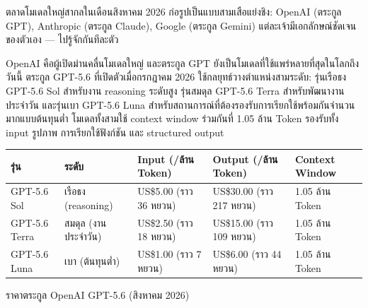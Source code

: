 


ตลาดโมเดลใหญ่สากลในเดือนสิงหาคม 2026 ก่อรูปเป็นแบบสามเสือแย่งชิง: OpenAI (ตระกูล GPT), Anthropic (ตระกูล Claude), Google (ตระกูล Gemini) แต่ละเจ้ามีเอกลักษณ์ชัดเจนของตัวเอง — ไปรู้จักกันทีละตัว


OpenAI คือผู้เปิดม่านคลื่นโมเดลใหญ่ และตระกูล GPT ยังเป็นโมเดลที่ใช้แพร่หลายที่สุดในโลกถึงวันนี้ ตระกูล GPT-5.6 ที่เปิดตัวเมื่อกรกฎาคม 2026 ใช้กลยุทธ์วางตำแหน่งสามระดับ: รุ่นเรือธง GPT-5.6 Sol สำหรับงาน reasoning ระดับสูง รุ่นสมดุล GPT-5.6 Terra สำหรับพัฒนางานประจำวัน และรุ่นเบา GPT-5.6 Luna สำหรับสถานการณ์ที่ต้องรองรับการเรียกใช้พร้อมกันจำนวนมากแบบต้นทุนต่ำ โมเดลทั้งสามใช้ context window ร่วมกันที่ 1.05 ล้าน Token รองรับทั้ง input รูปภาพ การเรียกใช้ฟังก์ชัน และ structured output

\begin{center}
\begin{tabularx}{\linewidth}{|X|X|X|X|X|}
\hline
\textbf{รุ่น} & \textbf{ระดับ} & \textbf{Input (/ล้าน Token)} & \textbf{Output (/ล้าน Token)} & \textbf{Context Window} \tabularnewline
\hline
GPT-5.6 Sol & เรือธง (reasoning) & US\$5.00 (ราว 36 หยวน) & US\$30.00 (ราว 217 หยวน) & 1.05 ล้าน Token \tabularnewline
GPT-5.6 Terra & สมดุล (งานประจำวัน) & US\$2.50 (ราว 18 หยวน) & US\$15.00 (ราว 109 หยวน) & 1.05 ล้าน Token \tabularnewline
GPT-5.6 Luna & เบา (ต้นทุนต่ำ) & US\$1.00 (ราว 7 หยวน) & US\$6.00 (ราว 44 หยวน) & 1.05 ล้าน Token \tabularnewline
\hline
\end{tabularx}
\end{center}

\begin{center}\small\color{gray}ราคาตระกูล OpenAI GPT-5.6 (สิงหาคม 2026)\end{center}


